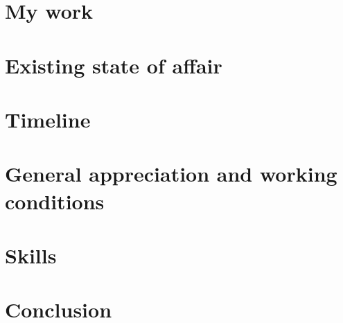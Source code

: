 \documentclass[a4paper, 12pt]{report}
\begin{document}
\section*{My work}
\section*{Existing state of affair}
\section*{Timeline}
\section*{General appreciation and working conditions}
\section*{Skills}
\section*{Conclusion}
\end{document}
